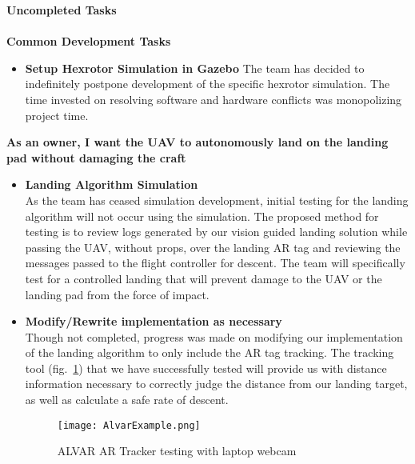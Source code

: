 \vspace{5mm}
\noindent\Large{\textbf{Uncompleted Tasks}}\\
\vspace{2mm}\\
\noindent \large{\textbf{Common Development Tasks}}
\normalsize
\begin{itemize}
\item \textbf{Setup Hexrotor Simulation in Gazebo}
The team has decided to indefinitely postpone development of the specific hexrotor simulation. The time invested on resolving software and hardware conflicts was monopolizing project time.
\end{itemize} 

\vspace{3mm}
\noindent \large{\textbf{As an owner, I want the UAV to autonomously land on the landing pad without damaging the craft}}
\normalsize
\begin{itemize}
\item \textbf{Landing Algorithm Simulation}\\
As the team has ceased simulation development, initial testing for the landing algorithm will not occur using the simulation. The proposed method for testing is to review logs generated by our vision guided landing solution while passing the UAV, without props, over the landing AR tag and reviewing the messages passed to the flight controller for descent. The team will specifically test for a controlled landing that will prevent damage to the UAV or the landing pad from the force of impact.
\item \textbf{Modify/Rewrite implementation as necessary}\\
Though not completed, progress was made on modifying our implementation of the landing algorithm to only include the AR tag tracking. The tracking tool (fig.~\ref{fig:artracker}) that we have successfully tested will provide us with distance information necessary to correctly judge the distance from our landing target, as well as calculate a safe rate of descent.
\begin{figure}[h]
\texttt{[image: AlvarExample.png]}
\centering
\caption{ALVAR AR Tracker testing with laptop webcam}
\label{fig:artracker}
\end{figure}

\end{itemize}


